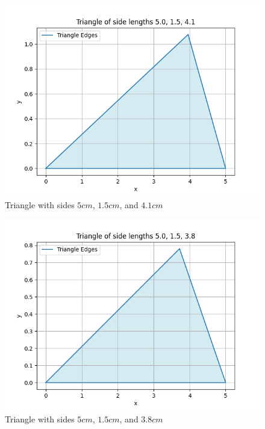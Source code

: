 \documentclass[journal]{IEEEtran}
\begin{document}
\begin{figure}[h!]
   \centering
   \includegraphics[width=0.7\linewidth]{figs/fig2.png}
   \caption{Triangle with sides $5cm$, $1.5cm$, and $4.1cm$}
\end{figure}

\begin{figure}[h!]
   \centering
   \includegraphics[width=0.7\linewidth]{figs/fig3.png}
   \caption{Triangle with sides $5cm$, $1.5cm$, and $3.8cm$}
\end{figure}
\end{document}
